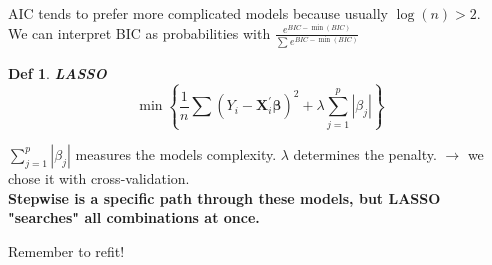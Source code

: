 \documentclass[7pt,landscape]{article}
\theoremstyle{def}
\newtheorem*{definition}{Def}%
\begin{document}
\begin{multicols}{3}
    AIC tends to prefer more complicated models because usually \( \log\left( n \right) > 2 \). \\ 
    We can interpret BIC as probabilities with \( \frac{e^{BIC - \min(BIC)}}{\sum_{}^{} e^{BIC-\min(BIC)}}  \) 
    \begin{definition}{\textbf{LASSO}}
        \[
            \min \left\{\frac{1}{n} \sum\left(Y_{i}-\boldsymbol{X}_{i}^{\prime} \boldsymbol{\beta}\right)^{2}+\lambda \sum_{j=1}^{p}\left|\beta_{j}\right|\right\}
            \] 
        \end{definition}
       
        \begin{multicols}{2}{\setlength{\columnsep}{0.01em}}
            \begin{center}
            \end{center}
            \vspace{0.5cm}

            \( \sum_{j=1}^{p}\left|\beta_{j}\right| \) measures the models complexity. \( \lambda \) determines the penalty. \( \to \) we chose it with cross-validation.\\
            \textbf{Stepwise is a specific path through these models, but LASSO "searches" all combinations at once.}
        \end{multicols}
        Remember to refit!


\end{multicols}
\end{document}
